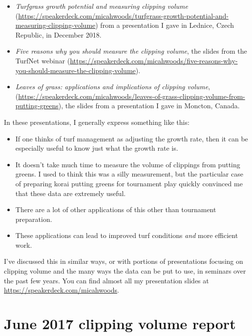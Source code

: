 \documentclass[12pt,b5,]{tufte-book}
\providecommand{\tightlist}{%
  \setlength{\itemsep}{0pt}\setlength{\parskip}{0pt}}
\begin{document}
\begin{itemize}
\tightlist
\item
  \emph{Turfgrass growth potential and measuring clipping volume} (\url{https://speakerdeck.com/micahwoods/turfgrass-growth-potential-and-measuring-clipping-volume}) from a presentation I gave in Lednice, Czech Republic, in December 2018.
\item
  \emph{Five reasons why you should measure the clipping volume}, the slides from the TurfNet webinar (\url{https://speakerdeck.com/micahwoods/five-reasons-why-you-should-measure-the-clipping-volume}).
\item
  \emph{Leaves of grass: applications and implications of clipping volume}, (\url{https://speakerdeck.com/micahwoods/leaves-of-grass-clipping-volume-from-putting-greens}), the slides from a presentation I gave in Moncton, Canada.
\end{itemize}

In these presentations, I generally express something like this:

\begin{itemize}
\tightlist
\item
  If one thinks of turf management as adjusting the growth rate, then it can be especially useful to know just what the growth rate is.
\item
  It doesn't take much time to measure the volume of clippings from putting greens. I used to think this was a silly measurement, but the particular case of preparing korai putting greens for tournament play quickly convinced me that these data are extremely useful.
\item
  There are a lot of other applications of this other than tournament preparation.
\item
  These applications can lead to improved turf conditions \emph{and} more efficient work.
\end{itemize}

I've discussed this in similar ways, or with portions of presentations focusing on clipping volume and the many ways the data can be put to use, in seminars over the past few years. You can find almost all my presentation slides at \url{https://speakerdeck.com/micahwoods}.

\hypertarget{june-2017-clipping-volume-report}{%
\chapter{June 2017 clipping volume report}\label{june-2017-clipping-volume-report}}
\end{document}
